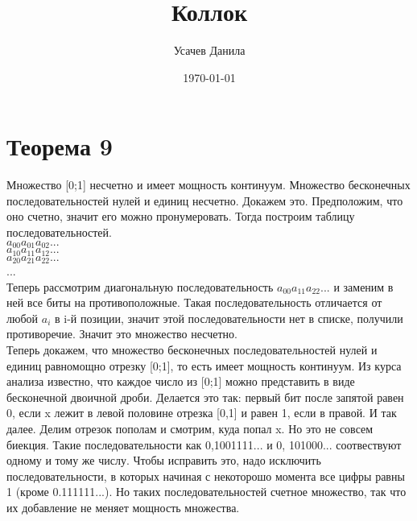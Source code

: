 \documentclass[12pt,a4paper]{scrartcl}
\title{Коллок}
\author{Усачев Данила}
\date{\today}
\begin{document}
\maketitle
\noindent

\section*{Теорема 9}
Множество [0;1] несчетно и имеет мощность континуум.
Множество бесконечных последовательностей нулей и единиц несчетно. Докажем это.
Предположим, что оно счетно, значит его можно пронумеровать. Тогда построим таблицу
последовательностей.\\
$a_{00} a_{01} a_{02} ...$\\
$a_{10} a_{11} a_{12} ...$\\
$a_{20} a_{21} a_{22} ...$\\
...\\
Теперь рассмотрим диагональную последовательность  $a_{00} a_{11} a_{22} ...$ и
заменим в ней все биты на противоположные. Такая последовательность отличается
от любой $a_{i}$ в i-й позиции, значит этой последовательности нет в списке,
получили противоречие. Значит это множество несчетно.\\
Теперь докажем, что множество бесконечных последовательностей нулей и единиц равномощно
отрезку [0;1], то есть имеет мощность континуум.
Из курса анализа известно, что каждое число из [0;1] можно представить в виде
бесконечной двоичной дроби. Делается это так: первый бит после запятой равен 0, если
x лежит в левой половине отрезка [0,1] и равен 1, если в правой. И так далее. Делим
отрезок пополам и смотрим, куда попал x. Но это не совсем биекция. Такие последовательности
как 0,1001111... и 0, 101000... соотвествуют одному и тому же числу. Чтобы исправить
это, надо исключить последовательности, в которых начиная с некоторошо момента все
цифры равны 1 (кроме 0.111111...). Но таких последовательностей счетное множество, так
что их добавление не меняет мощность множества.
\end{document}
